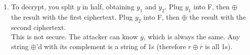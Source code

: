 \documentclass{article}
\begin{document}
\begin{enumerate}
	\item To decrypt, you split $y$ in half, obtaining $y_1$ and $y_2$. Plug $y_1$ into F, then $\oplus$ the result with the first ciphertext. Plug $y_2$ into F, then $\oplus$ the result with the second ciphertext. \\
		This is not secure. The attacker can know $y$, which is always the same. Any string $\oplus$\rq d with its complement is a string of 1s (therefore $r \oplus \overline{r}$ is all 1s).
\end{enumerate}
\end{document}
